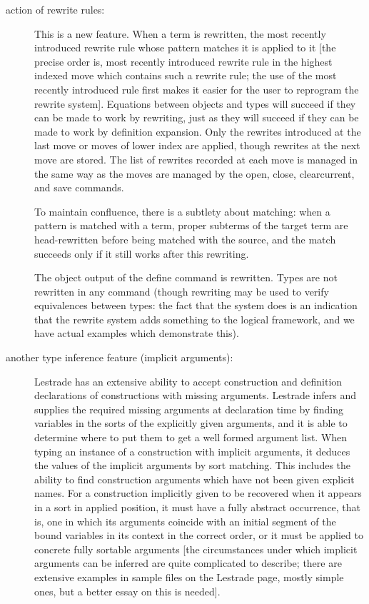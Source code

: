 \documentclass[12pt]{article}
\begin{document}
\begin{description}
\item[action of rewrite rules:]  This is a new feature.  When a term is rewritten, the most recently introduced rewrite rule whose pattern matches it is applied to it [the precise order is, most recently introduced rewrite rule in the highest indexed move which contains such a rewrite rule; the use of the most recently introduced rule first makes it easier for the user to reprogram the rewrite system].  Equations between objects and types will succeed if they can be made to work by rewriting, just as they will succeed if they can be made to work by definition expansion.  Only the rewrites introduced at the last move or moves of lower index are applied, though rewrites at the next move are stored.  The list of rewrites recorded at each move is managed in the same way as the moves are managed by the open, close, clearcurrent, and save commands.

To maintain confluence, there is a subtlety about matching:  when a pattern is matched with a term, proper subterms of the target term are head-rewritten before being matched with the source, and the match succeeds only if it still works after this rewriting.

The object output of the define command is rewritten.  Types are not rewritten in any command (though rewriting may be used to verify equivalences between types:  the fact that the system does is an indication that the rewrite system adds something to the logical framework, and we have actual examples which demonstrate this).  

\item[another type inference feature (implicit arguments):]   Lestrade has an extensive ability to accept construction and definition declarations of constructions with missing arguments.  Lestrade infers and supplies the required missing arguments at declaration time by finding variables in the sorts of the explicitly given arguments, and it is able to determine where to put them to get a well formed argument list.  When typing an instance of a construction with implicit arguments, it deduces the values of the implicit arguments by sort matching.  This includes the ability to find construction arguments which have not been given explicit names.  For a construction implicitly given to be recovered when it appears in a sort in applied position, it must have a fully abstract occurrence, that is, one in which its arguments coincide with an initial segment of the bound variables in its context in the correct order, or it must be applied to concrete fully sortable arguments [the circumstances under which implicit arguments can be inferred are quite complicated to describe; there are extensive examples in sample files on the Lestrade page, mostly simple ones, but a better essay on this is needed].


\end{description}
\end{document}

